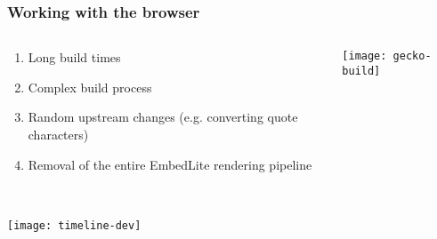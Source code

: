 \documentclass[
	notes=none,
	aspectratio=169
]{beamer}
\begin{document}
\begin{frame}
\frametitle{Working with the browser}

\begin{columns}[T]
\begin{column}[T]{0.5\textwidth}
\setlength{\parskip}{0.5em}

\vspace{1.2cm}
\begin{enumerate}
\setlength{\parskip}{0.5em}
\item Long build times
\item Complex build process
\item Random upstream changes (e.g. converting quote characters)
\item Removal of the entire EmbedLite rendering pipeline
\end{enumerate}

\end{column}
\begin{column}[T]{0.5\textwidth}
\setlength{\parskip}{0.5em}

\vspace{0.7cm}
\texttt{[image: gecko-build]}

\end{column}
\end{columns}

\end{frame}
\note{
}


\begin{frame}
\frametitle{}

\begin{columns}[T]
\begin{column}[T]{1.13\textwidth}

\vspace{0.0cm}
\texttt{[image: timeline-dev]}

\end{column}
\end{columns}

\end{frame}
\note{
}

\end{document}
